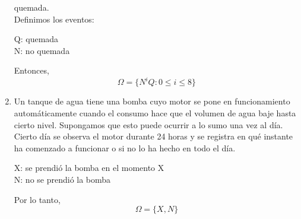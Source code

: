 \begin{enumerate}
        quemada.\e\\
            Definimos los eventos:
            \begin{center}
                Q: quemada\\
                N: no quemada
            \end{center}
            Entonces,
            \[\Omega=\{N^iQ:0\leq i\leq8\}\]
        \item Un tanque de agua tiene una bomba cuyo motor se pone en funcionamiento automáticamente cuando el consumo
        hace que el volumen de agua baje hasta cierto nivel. Supongamos que esto puede ocurrir a lo sumo una vez al
        día. Cierto día se observa el motor durante 24 horas y se registra en qué instante ha comenzado a funcionar o
        si no lo ha hecho en todo el día.\e
            \begin{center}
                X: se prendió la bomba en el momento X\\
                N: no se prendió la bomba
            \end{center}
            Por lo tanto,
            \[\Omega=\{X,N\}\]
    \end{enumerate}